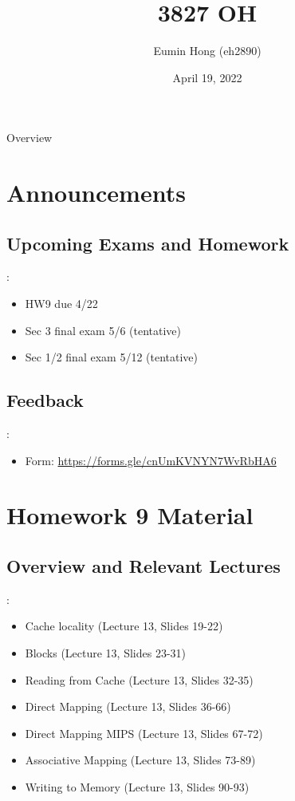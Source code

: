 \documentclass{../slides}
\title{3827 OH}
\author{Eumin Hong (eh2890)}
\institute{Columbia University}
\date{April 19, 2022}
\begin{document}
\begin{frame}
    \titlepage
\end{frame}

\begin{frame}{Overview}
\begin{multicols}{2}
\tableofcontents
\end{multicols}
\end{frame}

\section{Announcements}
\subsection{Upcoming Exams and Homework}
\begin{frame}{\secname: \subsecname}
    \begin{itemize}
        \item HW9 due 4/22
        \item Sec 3 final exam 5/6 (tentative)
        \item Sec 1/2 final exam 5/12 (tentative)
    \end{itemize}
\end{frame}

\subsection{Feedback}
\begin{frame}{\secname: \subsecname}
    \begin{itemize}
        \item Form: \url{https://forms.gle/cnUmKVNYN7WvRbHA6}
    \end{itemize}
\end{frame}

\section{Homework 9 Material}
\subsection{Overview and Relevant Lectures}
\begin{frame}{\secname: \subsecname}
    \begin{itemize}
        \item Cache locality (Lecture 13, Slides 19-22)
        \item Blocks (Lecture 13, Slides 23-31)
        \item Reading from Cache (Lecture 13, Slides 32-35)
        \item Direct Mapping (Lecture 13, Slides 36-66)
        \item Direct Mapping MIPS (Lecture 13, Slides 67-72)
        \item Associative Mapping (Lecture 13, Slides 73-89)
        \item Writing to Memory (Lecture 13, Slides 90-93)
    \end{itemize}
\end{frame}
\end{document}

